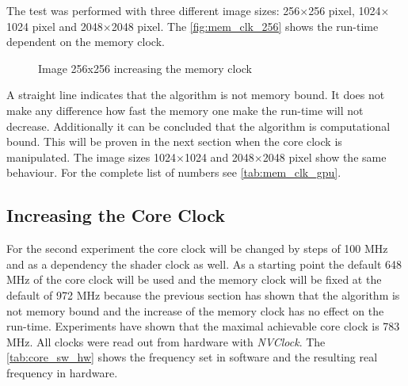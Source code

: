 The test was performed with three different image sizes: 256$\times$256 pixel, 
1024$\times$1024 pixel and 2048$\times$2048 pixel. The \autoref{fig:mem_clk_256}
shows the run-time dependent on the memory clock.

\begin{figure}[ht]
  \centering


  \tableA

 \label{fig:mem_clk_256}%
 \caption{Image 256x256 increasing the memory clock}
\end{figure}

A straight line indicates that the algorithm is not memory bound. It does not
make any difference how fast the memory one make the run-time will not decrease. 
Additionally it can be concluded that the algorithm is computational bound. This
will be proven in the next section when the core clock is manipulated. The image
sizes 1024$\times$1024 and 2048$\times$2048 pixel show the same behaviour. For 
the complete list of numbers see \autoref{tab:mem_clk_gpu}.


\subsection{Increasing the Core Clock} %
\label{sub:increasing_the_core_clock}
For the second experiment the core clock will be changed by steps of 100
\gls{MHz} and as a dependency the shader clock as well. As a starting point the
default 648 \gls{MHz} of the core clock will be used and the memory clock will
be fixed at the default of 972 \gls{MHz} because the previous section has shown
that the algorithm is not memory bound and the increase of the memory clock has
no effect on the run-time. Experiments have shown that the maximal achievable
core clock is 783 \gls{MHz}. All clocks were read out from hardware with
\emph{NVClock}. The \autoref{tab:core_sw_hw} shows the frequency set in software
and the resulting real frequency in hardware.

